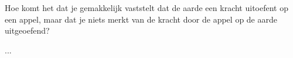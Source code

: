 
\begin{exercise}



Hoe komt het dat je gemakkelijk vaststelt dat de aarde een kracht uitoefent op een appel, maar dat je niets merkt van de kracht door de appel op de aarde uitgeoefend?


\begin{oplossing}
...
\end{oplossing}

\end{exercise}
